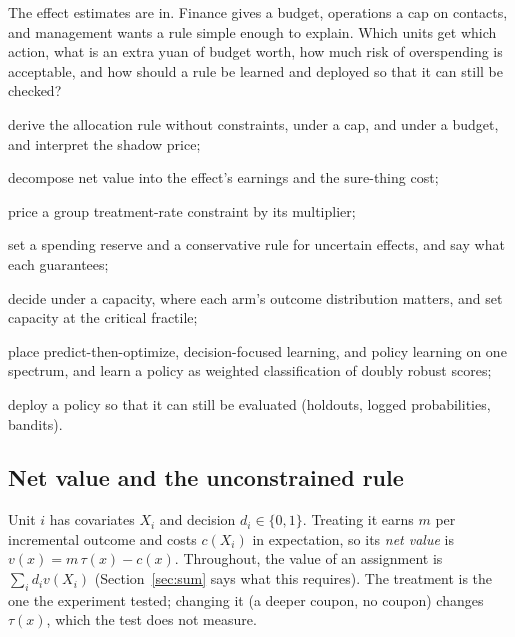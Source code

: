 \documentclass[11pt]{article}
\begin{document}

\begin{decision}
The effect estimates are in. Finance gives a budget, operations a cap on contacts, and management wants a rule simple
enough to explain. Which units get which action, what is an extra yuan of budget worth, how much risk of overspending
is acceptable, and how should a rule be learned and deployed so that it can still be checked?
\end{decision}

\begin{goals}
  \item derive the allocation rule without constraints, under a cap, and under a budget, and interpret the shadow
  price;
  \item decompose net value into the effect's earnings and the sure-thing cost;
  \item price a group treatment-rate constraint by its multiplier;
  \item set a spending reserve and a conservative rule for uncertain effects, and say what each guarantees;
  \item decide under a capacity, where each arm's outcome distribution matters, and set capacity at the critical
  fractile;
  \item place predict-then-optimize, decision-focused learning, and policy learning on one spectrum, and learn a policy
  as weighted classification of doubly robust scores;
  \item deploy a policy so that it can still be evaluated (holdouts, logged probabilities, bandits).
\end{goals}

\sectionone

\subsection{Net value and the unconstrained rule}

Unit $i$ has covariates $X_i$ and decision $d_i \in \{0,1\}$. Treating it earns $m$ per incremental outcome and costs
$c(X_i)$ in expectation, so its \emph{net value} is $v(x) = m\,\tau(x) - c(x)$. Throughout, the value of an assignment is
$\sum_i d_i v(X_i)$ (Section~\ref{sec:sum} says what this requires). The treatment is the one the experiment tested; changing it
(a deeper coupon, no coupon) changes $\tau(x)$, which the test does not measure.
\end{document}
